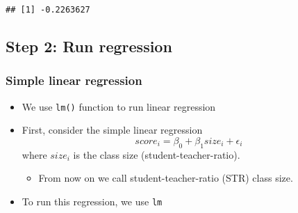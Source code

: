 \documentclass[]{book}
\newenvironment{Shaded}{\begin{snugshade}}{\end{snugshade}}
\newcommand{\CommentTok}[1]{\textcolor[rgb]{0.56,0.35,0.01}{\textit{#1}}}
\newcommand{\DataTypeTok}[1]{\textcolor[rgb]{0.13,0.29,0.53}{#1}}
\newcommand{\KeywordTok}[1]{\textcolor[rgb]{0.13,0.29,0.53}{\textbf{#1}}}
\newcommand{\NormalTok}[1]{#1}
\newcommand{\OperatorTok}[1]{\textcolor[rgb]{0.81,0.36,0.00}{\textbf{#1}}}
\newcommand{\StringTok}[1]{\textcolor[rgb]{0.31,0.60,0.02}{#1}}
\providecommand{\tightlist}{%
  \setlength{\itemsep}{0pt}\setlength{\parskip}{0pt}}
\begin{document}
\begin{Shaded}
\end{Shaded}

\begin{verbatim}
## [1] -0.2263627
\end{verbatim}

\hypertarget{step-2-run-regression}{%
\subsection{Step 2: Run regression}\label{step-2-run-regression}}

\hypertarget{simple-linear-regression}{%
\subsubsection{Simple linear regression}\label{simple-linear-regression}}

\begin{itemize}
\tightlist
\item
  We use \texttt{lm()} function to run linear regression
\item
  First, consider the simple linear regression
  \[
  score_i = \beta_0 + \beta_1 size_i + \epsilon_i
  \]
  where \(size_i\) is the class size (student-teacher-ratio).

  \begin{itemize}
  \tightlist
  \item
    From now on we call student-teacher-ratio (STR) class size.
  \end{itemize}
\item
  To run this regression, we use \texttt{lm}
\end{itemize}

\begin{Shaded}
\end{Shaded}
\end{document}
